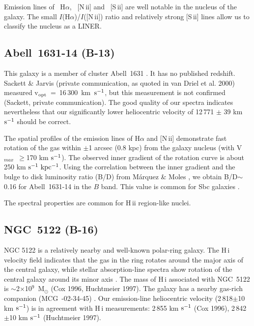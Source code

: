 Emission lines of ~H$\alpha$,  ~[N\,{\sc  ii}] and ~[S\,{\sc  ii}] are well
notable     in    the     nucleus     of    the     galaxy.    The    small
\hbox{$I$(H$\alpha$)/$I$([N\,{\sc   ii}])}  ratio  and  relatively   strong
[S\,{\sc ii}] lines allow us to classify the nucleus as a LINER.

\subsection{Abell~1631-14 (B-13)}

This  galaxy  is a  member  of  cluster  Abell~1631  \cite{tsw}.  It has no
published redshift.  Sackett \& Jarvis (private communication, as quoted in
van Driel et al.  2000)  measured  \hbox{v$_{\rm  opt}$ =  16\,300  km $\rm
s^{-1}$},  but  this  measurement  is  not  confirmed   (Sackett,   private
communication).  The good  quality of our  spectra  indicates  nevertheless
that our significantly  lower heliocentric  velocity of 12\,771 $\pm$ 39 km
$\rm s^{-1}$ should be correct.

The spatial  profiles of the emission  lines of H$\alpha$ and [N\,{\sc ii}]
demonstrate  fast rotation of the gas within  $\pm$1  arcsec (0.8 kpc) from
the  galaxy  nucleus  (with   V$_{max}$~$\geq$170  km  $\rm  s^{-1}$).  The
observed inner  gradient of the rotation  curve is about 250 km $\rm s^{-1}
~kpc^{-1}$.  Using the correlation between the inner gradient and the bulge
to disk luminosity ratio (B/D) from M\'arquez \& Moles  , we
obtain  B/D$\sim$0.16  for  Abell~1631-14  in the $B$ band.  This  value is
common for Sbc galaxies \cite{sv}.

The spectral properties are common for H\,{\sc ii} region-like nuclei.

\subsection{NGC~5122 (B-16)}

NGC 5122 is a  relatively  nearby and  well-known  polar-ring  galaxy.  The
H\,{\sc i} velocity field indicates that the gas in the ring rotates around
the major axis of the central galaxy, while stellar absorption-line spectra
show rotation of the central  galaxy around its minor axis  \cite{co}.  The
mass     of     H\,{\sc     i}     associated      with     NGC~5122     is
$\sim$2$\times$10$^9$~M$_{\odot}$  (Cox 1996, Huchtmeier 1997).  The galaxy
has   a   nearby   gas-rich   companion   (MCG~-02-34-45)   \cite{co}.  Our
emission-line  heliocentric velocity  (2\,818$\pm$10 km $\rm s^{-1}$) is in
agreement with H\,{\sc i} measurements:  2\,855 km $\rm s^{-1}$ (Cox 1996),
2\,842$\pm$10 km $\rm s^{-1}$ (Huchtmeier 1997).

